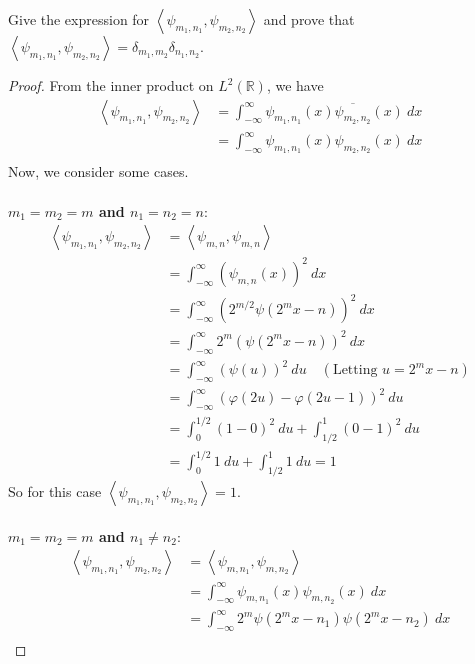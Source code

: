\documentclass{article}
\newcommand{\parens}[1]{\left(#1\right)}
\newcommand{\R}{\mathbb{R}}
\newcommand{\abracks}[1]{\left< #1\right>}
\begin{document}
        \item Give the expression for $\abracks{\psi_{m_1,n_1}, \psi_{m_2,n_2}}$ and prove 
        that $\abracks{\psi_{m_1,n_1}, \psi_{m_2,n_2}} = \delta_{m_1, m_2}\delta_{n_1,n_2}$.
        \begin{proof}
        From the inner product on $L^2\parens{\R}$, we have
        \begin{align*}
        \abracks{\psi_{m_1,n_1}, \psi_{m_2,n_2}} &= \int_{-\infty}^\infty \psi_{m_1, n_1}(x)
        \overline{\psi_{m_2, n_2}}(x)\ dx \\
        &= \int_{-\infty}^\infty \psi_{m_1, n_1}(x)\psi_{m_2, n_2}(x)\ dx \\
        \end{align*}
        Now, we consider some cases.\\\\
        \textbf{$m_1 = m_2 = m$ and $n_1 = n_2 = n$}:\\
        \begin{align*}
        \abracks{\psi_{m_1,n_1}, \psi_{m_2,n_2}} &= \abracks{\psi_{m,n}, \psi_{m,n}} \\
        &= \int_{-\infty}^\infty \parens{\psi_{m, n}(x)}^2\ dx \\
        &= \int_{-\infty}^\infty \parens{2^{m/2}\psi(2^mx - n)}^2\ dx \\
        &= \int_{-\infty}^\infty 2^m\parens{\psi(2^mx - n)}^2\ dx \\
        &= \int_{-\infty}^\infty \parens{\psi(u)}^2\ du \quad (\text{Letting }u = 2^mx-n) \\
        &= \int_{-\infty}^\infty \parens{\varphi(2u) - \varphi(2u-1)}^2\ du \\
        &= \int_0^{1/2} (1-0)^2\ du + \int_{1/2}^1 (0-1)^2\ du \\
        &=\int_0^{1/2} 1\ du + \int_{1/2}^1 1\ du = 1
        \end{align*}
        So for this case $\abracks{\psi_{m_1,n_1}, \psi_{m_2,n_2}} = 1$.\\\\
        \textbf{$m_1 = m_2 = m$ and $n_1 \neq n_2$}:\\
        \begin{align*}
        \abracks{\psi_{m_1,n_1}, \psi_{m_2,n_2}} &= \abracks{\psi_{m,n_1}, \psi_{m,n_2}} \\
        &= \int_{-\infty}^\infty \psi_{m, n_1}(x)\psi_{m,n_2}(x)\ dx \\
        &= \int_{-\infty}^\infty 2^m\psi(2^mx - n_1)\psi(2^mx - n_2)\ dx \\

\end{align*}
\end{proof}
\end{document}

